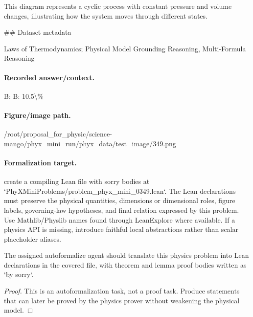 This diagram represents a cyclic process with constant pressure and volume changes, illustrating how the system moves through different states.

\#\# Dataset metadata

Laws of Thermodynamics; Physical Model Grounding Reasoning, Multi-Formula Reasoning

\paragraph{Recorded answer/context.}
B: B: 10.5\textbackslash{}\%

\paragraph{Figure/image path.}
/root/proposal\_for\_physic/science-mango/phyx\_mini\_run/phyx\_data/test\_image/349.png

\paragraph{Formalization target.}
create a compiling Lean file with sorry bodies at `PhyXMiniProblems/problem\_phyx\_mini\_0349.lean`. The Lean declarations must preserve the physical quantities, dimensions or dimensional roles, figure labels, governing-law hypotheses, and final relation expressed by this problem.
Use Mathlib/Physlib names found through LeanExplore where available. If a physics API is missing, introduce faithful local abstractions rather than scalar placeholder aliases.

\begin{theorem}
\label{thm:physics:phyx_mini_0349:target}
The assigned autoformalize agent should translate this physics problem into Lean declarations in the covered file, with theorem and lemma proof bodies written as `by sorry`.
\end{theorem}
\begin{proof}
This is an autoformalization task, not a proof task. Produce statements that can later be proved by the physics prover without weakening the physical model.
\end{proof}

